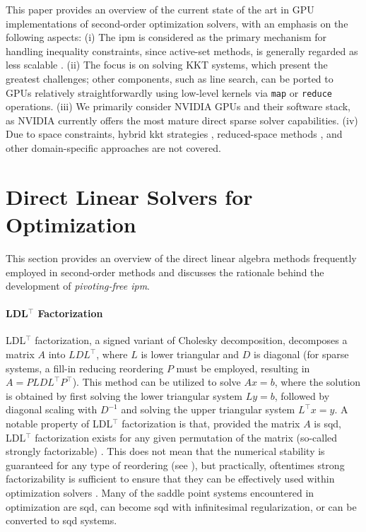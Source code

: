 \documentclass{article}
\begin{document}
This paper provides an overview of the current state of the art in GPU implementations of second-order optimization solvers, with an emphasis on the following aspects:
(i) The \gls*{ipm} is considered as the primary mechanism for handling inequality constraints, since active-set methods, is generally regarded as less scalable \cite{nocedalNumericalOptimization2006}.
(ii) The focus is on solving KKT systems, which present the greatest challenges; other components, such as line search, can be ported to GPUs relatively straightforwardly using low-level kernels via \texttt{map} or \texttt{reduce} operations.
(iii) We primarily consider NVIDIA GPUs and their software stack, as NVIDIA currently offers the most mature direct sparse solver capabilities.
(iv) Due to space constraints, hybrid \gls*{kkt} strategies \cite{regevHyKKTHybridDirectiterative2023}, reduced-space methods \cite{pacaudAcceleratingCondensedInteriorPoint2023}, and other domain-specific approaches \cite{adabagMPCGPURealTimeNonlinear2024} are not covered.

\section{Direct Linear Solvers for Optimization}\label{eqn:linear}
This section provides an overview of the direct linear algebra methods frequently employed in second-order methods and discusses the rationale behind the development of \emph{pivoting-free \gls*{ipm}}.

\paragraph{LDL$^\top$ Factorization}
LDL$^\top$ factorization, a signed variant of Cholesky decomposition, decomposes a matrix $A$ into $LDL^\top$, where $L$ is lower triangular and $D$ is diagonal (for sparse systems, a fill-in reducing reordering $P$ must be employed, resulting in $A = P L D L^\top P^\top$). This method can be utilized to solve $Ax = b$, where the solution is obtained by first solving the lower triangular system $Ly = b$, followed by diagonal scaling with $D^{-1}$ and solving the upper triangular system $L^\top x = y$.
A notable property of LDL$^\top$ factorization is that, provided the matrix $A$ is \gls*{sqd}, LDL$^\top$ factorization exists for any given permutation of the matrix (so-called strongly factorizable) \cite{vanderbeiSymmetricQuasidefiniteMatrices1995}.
This does not mean that the numerical stability is guaranteed for any type of reordering (see \cite{vanderbeiSymmetricQuasidefiniteMatrices1995}), but practically, oftentimes strong factorizability is sufficient to ensure that they can be effectively used within optimization solvers \cite{stellatoOSQPOperatorSplitting2020}.
Many of the saddle point systems encountered in optimization are \gls*{sqd}, can become \gls*{sqd} with infinitesimal regularization, or can be converted to \gls*{sqd} systems.
\end{document}
